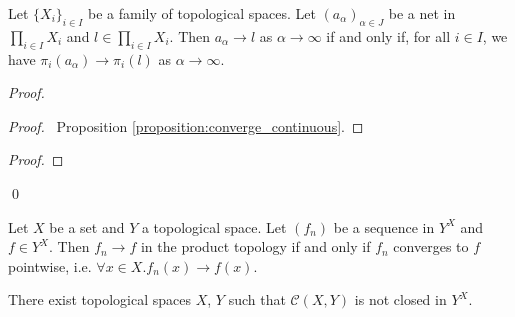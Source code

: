 \begin{proposition}
    \label{proposition:converge_product}
    Let $\{ X_i \}_{i \in I}$ be a family of topological spaces. Let $(a_\alpha)_{\alpha \in J}$ be a net in $\prod_{i \in I} X_i$ and $l \in \prod_{i \in I} X_i$.
    Then $a_\alpha \rightarrow l$ as $\alpha \rightarrow \infty$ if and only if, for all $i \in I$, we have $\pi_i(a_\alpha) \rightarrow \pi_i(l)$ as $\alpha \rightarrow \infty$.
\end{proposition}

\begin{proof}
    \pf
    \begin{proof}
        \pf\ Proposition \ref{proposition:converge_continuous}. %
    \end{proof}
    \begin{proof}
    \end{proof}
    \qed
\end{proof}

\begin{corollary}
    Let $X$ be a set and $Y$ a topological space. Let $(f_n)$ be a sequence in $Y^X$ and $f \in Y^X$.
    Then $f_n \rightarrow f$ in the product topology if and only if $f_n$ converges to $f$ pointwise,
    i.e. $\forall x \in X. f_n(x) \rightarrow f(x)$.
\end{corollary}

\begin{corollary}
    There exist topological spaces $X$, $Y$ such that $\mathcal{C}(X,Y)$ is not closed in $Y^X$.
\end{corollary}

